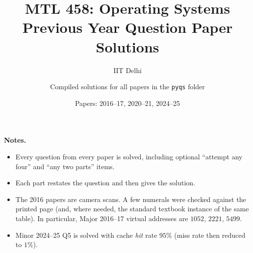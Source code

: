 \documentclass[11pt,a4paper]{article}
\title{\textbf{MTL 458: Operating Systems}\\[0.4em]
\large Previous Year Question Paper Solutions}
\author{IIT Delhi \and Compiled solutions for all papers in the \texttt{pyqs} folder}
\date{Papers: 2016--17, 2020--21, 2024--25}
\begin{document}
\maketitle
\tableofcontents
\newpage

\noindent\textbf{Notes.}
\begin{itemize}[leftmargin=1.2em]
  \item Every question from every paper is solved, including optional
        ``attempt any four'' and ``any two parts'' items.
  \item Each part restates the question and then gives the solution.
  \item The 2016 papers are camera scans. A few numerals were checked
        against the printed page (and, where needed, the standard
        textbook instance of the same table). In particular, Major
        2016--17 virtual addresses are \(1052\), \(2221\), \(5499\).
  \item Minor 2024--25 Q5 is solved with cache \emph{hit} rate \(95\%\)
        (miss rate then reduced to \(1\%\)).
\end{itemize}

\newpage

\newpage

\newpage

\newpage

\newpage

\newpage

\end{document}
